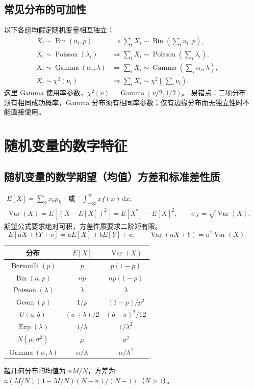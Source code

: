 \documentclass[../main.tex]{subfiles}
\begin{document}
\subsection{常见分布的可加性}
以下各组均假定随机变量相互独立：
\begin{align*}
X_i\sim\operatorname{Bin}(n_i,p)&\Longrightarrow\sum_iX_i\sim\operatorname{Bin}\left(\sum_in_i,p\right),\\
X_i\sim\operatorname{Poisson}(\lambda_i)&\Longrightarrow\sum_iX_i\sim\operatorname{Poisson}\left(\sum_i\lambda_i\right),\\
X_i\sim\operatorname{Gamma}(\alpha_i,\lambda)&\Longrightarrow\sum_iX_i\sim\operatorname{Gamma}\left(\sum_i\alpha_i,\lambda\right),\\
X_i\sim\chi^2(\nu_i)&\Longrightarrow\sum_iX_i\sim\chi^2\left(\sum_i\nu_i\right).
\end{align*}
这里 Gamma 使用率参数，$\chi^2(\nu)=\operatorname{Gamma}(\nu/2,1/2)$。
易错点：二项分布须有相同成功概率，Gamma 分布须有相同率参数；仅有边缘分布而无独立性时不能直接使用。
\section{随机变量的数字特征}
\subsection{随机变量的数学期望（均值）方差和标准差性质}
\[
\begin{gathered}
E[X]=\sum_kx_kp_k\quad\text{或}\quad\int_{-\infty}^{\infty}xf(x)\,\mathrm dx,\\
\operatorname{Var}(X)=E[(X-E[X])^2]=E[X^2]-E[X]^2,\qquad
\sigma_X=\sqrt{\operatorname{Var}(X)}.
\end{gathered}
\]
期望公式要求绝对可积，方差性质要求二阶矩有限。
\[
E[aX+bY+c]=aE[X]+bE[Y]+c,\qquad
\operatorname{Var}(aX+b)=a^2\operatorname{Var}(X).
\]
\begin{center}
\begin{tabular}{c|c|c}
分布 & $E[X]$ & $\operatorname{Var}(X)$\\\hline
$\operatorname{Bernoulli}(p)$ & $p$ & $p(1-p)$\\
$\operatorname{Bin}(n,p)$ & $np$ & $np(1-p)$\\
$\operatorname{Poisson}(\lambda)$ & $\lambda$ & $\lambda$\\
$\operatorname{Geom}(p)$ & $1/p$ & $(1-p)/p^2$\\
$U(a,b)$ & $(a+b)/2$ & $(b-a)^2/12$\\
$\operatorname{Exp}(\lambda)$ & $1/\lambda$ & $1/\lambda^2$\\
$N(\mu,\sigma^2)$ & $\mu$ & $\sigma^2$\\
$\operatorname{Gamma}(\alpha,\lambda)$ & $\alpha/\lambda$ & $\alpha/\lambda^2$
\end{tabular}
\end{center}
超几何分布的均值为 $nM/N$，方差为 $n(M/N)(1-M/N)(N-n)/(N-1)$（$N>1$）。
\end{document}
